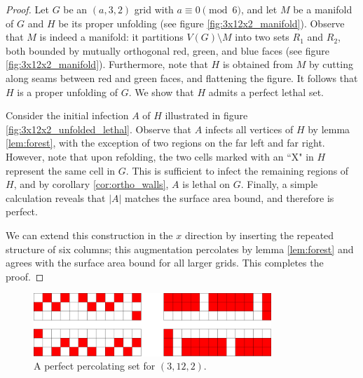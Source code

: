 \begin{proof}
Let $G$ be an $(a,3,2)$ grid with $a \equiv 0 \pmod 6$, and let $M$ be a manifold of $G$ and $H$ be its proper unfolding (see figure \ref{fig:3x12x2_manifold}). Observe that $M$ is indeed a manifold: it partitions $V(G) \setminus M$ into two sets $R_1$ and $R_2$, both bounded by mutually orthogonal red, green, and blue faces (see figure \ref{fig:3x12x2_manifold}). Furthermore, note that $H$ is obtained from $M$ by cutting along seams between red and green faces, and flattening the figure. It follows that $H$ is a proper unfolding of $G$. We show that $H$ admits a perfect lethal set. 

Consider the initial infection $A$ of $H$ illustrated in figure \ref{fig:3x12x2_unfolded_lethal}. Observe that $A$ infects all vertices of $H$ by lemma \ref{lem:forest}, with the exception of two regions on the far left and far right. However, note that upon refolding, the two cells marked with an ``X" in $H$ represent the same cell in $G$. This is sufficient to infect the remaining regions of $H$, and by corollary \ref{cor:ortho_walls}, $A$ is lethal on $G$. Finally, a simple calculation reveals that $|A|$ matches the surface area bound, and therefore is perfect.

We can extend this construction in the $x$ direction by inserting the repeated structure of six columns; this augmentation percolates by lemma \ref{lem:forest} and agrees with the surface area bound for all larger grids. This completes the proof.
\end{proof}

\begin{figure}[]
\centering
\includegraphics[width=0.8\textwidth]{figures/7/3x12x2.pdf}
\caption{A perfect percolating set for $(3,12,2)$.}
\label{fig:3x12x2}
\end{figure} 

